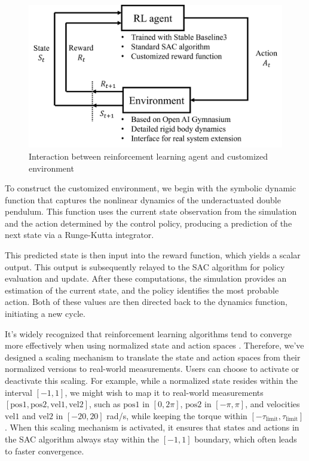 \begin{figure}[htbp]
    \centering
    \includegraphics[width=0.8\linewidth]{figures/simulation_result/RL_interaction.png}
    \caption{Interaction between reinforcement learning agent and customized environment}
    \label{fig:my_label}
\end{figure}

To construct the customized environment, we begin with the symbolic dynamic function that captures the nonlinear dynamics of the underactuated double pendulum. This function uses the current state observation from the simulation and the action determined by the control policy, producing a prediction of the next state via a Runge-Kutta integrator.

This predicted state is then input into the reward function, which yields a scalar output. This output is subsequently relayed to the SAC algorithm for policy evaluation and update. After these computations, the simulation provides an estimation of the current state, and the policy identifies the most probable action. Both of these values are then directed back to the dynamics function, initiating a new cycle.

It's widely recognized that reinforcement learning algorithms tend to converge more effectively when using normalized state and action spaces \cite{sutton2018reinforcement}. Therefore, we've designed a scaling mechanism to translate the state and action spaces from their normalized versions to real-world measurements. Users can choose to activate or deactivate this scaling. For example, while a normalized state resides within the interval \( [-1,1] \), we might wish to map it to real-world measurements \( \left[ \text{pos1}, \text{pos2}, \text{vel1}, \text{vel2} \right] \), such as \( \text{pos1} \) in \( [0,2\pi] \), \( \text{pos2} \) in \( [-\pi,\pi] \), and velocities \( \text{vel1} \) and \( \text{vel2} \) in \( [-20,20] \) rad/s, while keeping the torque within \( [-\tau_{\text{limit}}, \tau_{\text{limit}}] \). When this scaling mechanism is activated, it ensures that states and actions in the SAC algorithm always stay within the \( [-1,1] \) boundary, which often leads to faster convergence. 


